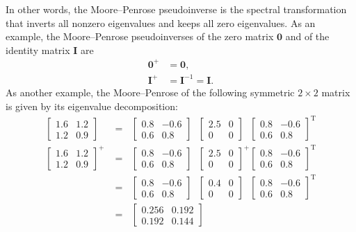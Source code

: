 \documentclass[11pt,a4paper]{book}
\begin{document}
In other words, the Moore--Penrose pseudoinverse is the spectral
transformation that inverts all nonzero eigenvalues and keeps all zero
eigenvalues.  As an example, the Moore--Penrose pseudoinverses of the
zero matrix $\mathbf 0$ and of the identity matrix $\mathbf I$ are
\begin{align*}
  \mathbf 0^+ &= \mathbf 0, \\
  \mathbf I^+ &= \mathbf I^{-1} = \mathbf I. 
\end{align*}
As another example, the Moore--Penrose of the following symmetric
$2\times 2$ matrix is given by its eigenvalue decomposition:
\begin{align*}
  \left[ \begin{array}{cc} 1.6 & 1.2 \\ 1.2 &
      0.9 \end{array}\right]^{\phantom +}
  &=^{\phantom +} \left[ \begin{array}{cc} 0.8 & -0.6 \\ 0.6 & 0.8 \end{array}\right]^{\phantom +}
  \left[ \begin{array}{cc} 2.5 & 0 \\ 0 & 0 \end{array} \right]^{\phantom +}
  \left[ \begin{array}{cc} 0.8 & -0.6 \\ 0.6 &
      0.8 \end{array}\right]^{\mathrm T} \\
  \left[ \begin{array}{cc} 1.6 & 1.2 \\ 1.2 & 0.9 \end{array}\right]^+
  &=^{\phantom +} \left[ \begin{array}{cc} 0.8 & -0.6 \\ 0.6 & 0.8 \end{array}\right]^{\phantom +}
  \left[ \begin{array}{cc} 2.5 & 0 \\ 0 & 0 \end{array} \right]^+
  \left[ \begin{array}{cc} 0.8 & -0.6 \\ 0.6 &
      0.8 \end{array}\right]^{\mathrm T} \\
  &=^{\phantom +} \left[ \begin{array}{cc} 0.8 & -0.6 \\ 0.6 & 0.8 \end{array}\right]^{\phantom +}
  \left[ \begin{array}{cc} 0.4 & 0 \\ 0 & 0 \end{array} \right]^{\phantom +}
  \left[ \begin{array}{cc} 0.8 & -0.6 \\ 0.6 &
      0.8 \end{array}\right]^{\mathrm T} \\
  &=^{\phantom +} \left[ \begin{array}{cc} 0.256 & 0.192 \\ 0.192 & 0.144 \end{array}\right]
\end{align*}
\end{document}
